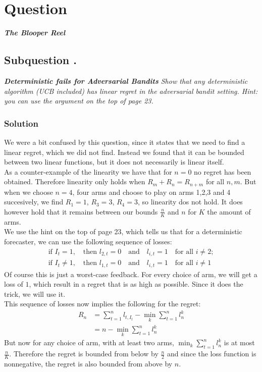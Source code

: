\documentclass{article}
\newcounter{counterquestion}
\newenvironment{question}[1]
{
\stepcounter{counterquestion}
\section*{Question \thecounterquestion}
\emph{#1} 
} 
{
}
\newcounter{countersubquestion}[counterquestion]
\newenvironment{subquestion}[1]
{
\stepcounter{countersubquestion}
\subsection*{Subquestion \thecounterquestion .\thecountersubquestion}
\emph{#1} 
} 
{
}
\newenvironment{solution}
{
\subsubsection*{Solution}
} 
{
}
\begin{document}
\begin{question}{\textbf{The Blooper Reel}}

\begin{subquestion}{\textbf{Deterministic fails for Adversarial Bandits} Show that any deterministic algorithm (UCB included) has linear regret in the adversarial bandit setting. Hint: you can use the argument on the top of page 23.}
\end{subquestion}
\begin{solution}
We were a bit confused by this question, since it states that we need to find a linear regret, which we did not find. Instead we found that it can be bounded between two linear functions, but it does not necessarily is linear itself.\\
As a counter-example of the linearity we have that for $n=0$ no regret has been obtained. Therefore linearity only holds when $R_m+R_n=R_{n+m}$ for all $n,m$. But when we choose $n=4$, four arms and choose to play on arms 1,2,3 and 4 succesively, we find $R_1=1$, $R_3=3$, $R_4=3$, so linearity dos not hold. It does however hold that it remains between our bounds $\frac{n}{K}$ and $n$ for $K$ the amount of arms.\\
We use the hint on the top of page 23, which tells us that for a deterministic forecaster, we can use the following sequence of losses:
\begin{align*}
\text{if }I_t=1, \quad \text{then }l_{2,t}=0\quad \text{and}\quad l_{i,t}=1\quad \text{for all }i\neq 2;\\
\text{if }I_t\neq 1, \quad \text{then }l_{1,t}=0\quad \text{and}\quad l_{i,t}=1\quad \text{for all }i\neq 1
\end{align*}
Of course this is just a worst-case feedback. For every choice of arm, we will get a loss of $1$, which result in a regret that is as high as possible. Since it does the trick, we will use it.\\
This sequence of losses now implies the following for the regret:
\begin{align*}
R_n&=\sum _{t=1} ^n l_{t,I_t}-\min _k \sum _{t=1}^nl_n^k\\
&=n-\min _k \sum _{t=1}^nl_n^k
\end{align*}
But now for any choice of arm, with at least two arms, $\min _k \sum _{t=1}^nl_n^k$ is at most $\frac{n}{K}$. Therefore the regret is bounded from below by $\frac{n}{2}$ and since the loss function is nonnegative, the regret is also bounded from above by $n$.
\end{solution}

\end{question}
\end{document}
